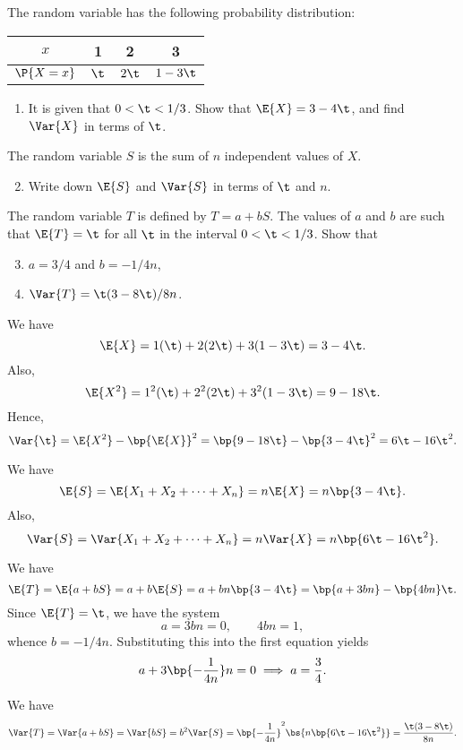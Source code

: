 \begin{problem}
    The random variable has the following probability distribution:

    \begin{table}[H]
        \centering
        \begin{tabular}{|c|c|c|c|}
        \hline
        $x$ & 1 & 2 & 3  \\ \hline
        $\P{X = x}$ & $\t$ & $2\t$ & $1-3\t$ \\\hline
        \end{tabular}
    \end{table}

    \begin{enumerate}
        \item It is given that $0 < \t < 1/3$. Show that $\E{X} = 3 - 4\t$, and find $\Var{X}$ in terms of $\t$.
    \end{enumerate}

    The random variable $S$ is the sum of $n$ independent values of $X$.

    \begin{enumerate}
        \setcounter{enumi}{1}
        \item Write down $\E{S}$ and $\Var{S}$ in terms of $\t$ and $n$.
    \end{enumerate}

    The random variable $T$ is defined by $T = a + bS$. The values of $a$ and $b$ are such that $\E{T} = \t$ for all $\t$ in the interval $0 < \t < 1/3$. Show that
    \begin{enumerate}
        \setcounter{enumi}{2}
        \item $a = 3/4$ and $b = -1/4n$,
        \item $\Var{T} = \t(3-8\t)/8n$.
    \end{enumerate}
\end{problem}
\begin{solution}
    \begin{ppart}
        We have \[\E{X} = 1(\t) + 2(2\t) + 3(1 - 3\t) = 3 - 4\t.\] Also, \[\E{X^2} = 1^2(\t) + 2^2 (2\t) + 3^2(1 - 3\t) = 9 - 18\t.\] Hence, \[\Var{\t} = \E{X^2} - \bp{\E{X}}^2 = \bp{9 - 18\t} - \bp{3-4\t}^2 = 6\t - 16\t^2.\]
    \end{ppart}
    \begin{ppart}
        We have \[\E{S} = \E{X_1 + X_2 + \dots + X_n} = n \E{X} = n\bp{3 - 4\t}.\] Also, \[\Var{S} = \Var{X_1 + X_2 + \dots + X_n} = n\Var{X} = n\bp{6\t - 16\t^2}.\]
    \end{ppart}
    \begin{ppart}
        We have \[\E{T} = \E{a + bS} = a + b\E{S} = a + bn\bp{3 - 4\t} = \bp{a + 3bn} - \bp{4bn} \t.\] Since $\E{T} = \t$, we have the system \[a = 3bn = 0, \qquad 4bn = 1,\] whence $b = -1/4n$. Substituting this into the first equation yields \[a + 3\bp{-\frac1{4n}}n = 0 \implies a = \frac34.\]
    \end{ppart}
    \begin{ppart}
        We have \[\Var{T} = \Var{a + bS} = \Var{bS} = b^2 \Var{S} = \bp{-\frac1{4n}}^2 \bs{n \bp{6\t - 16\t^2}} = \frac{\t (3 - 8\t)}{8n}.\]
    \end{ppart}
\end{solution}